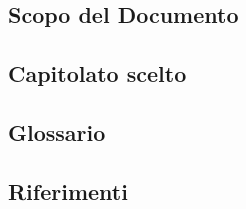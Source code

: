 \subsection{Scopo del Documento}

\subsection{Capitolato scelto}

\subsection{Glossario}

\subsection{Riferimenti}


